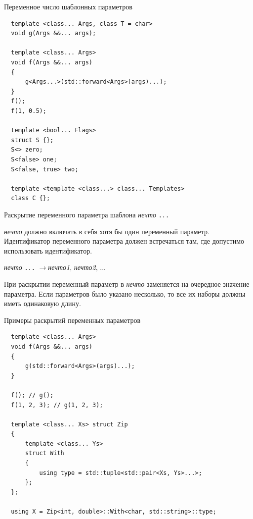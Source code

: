 \documentclass[unknownkeysallowed,xcolor=table]{beamer}
\newcommand{\rarr}{$\rightarrow$}
\begin{document}
\begin{frame}[fragile]{Переменное число шаблонных параметров}
  \begin{lstlisting}
  template <class... Args, class T = char>
  void g(Args &&... args);

  template <class... Args>
  void f(Args &&... args)
  {
      g<Args...>(std::forward<Args>(args)...);
  }
  f();
  f(1, 0.5);

  template <bool... Flags>
  struct S {};
  S<> zero;
  S<false> one;
  S<false, true> two;

  template <template <class...> class... Templates>
  class C {};
  \end{lstlisting}
\end{frame}

\begin{frame}[fragile]{Раскрытие переменного параметра шаблона}
  \emph{нечто} \lstinline{...}

  \vspace{1em}

  \emph{нечто} должно включать в себя хотя бы один переменный параметр.
  Идентификатор переменного параметра должен встречаться там, где допустимо использовать идентификатор.

  \vspace{0.5em}

  \emph{нечто} \lstinline{...} \rarr \emph{нечто1}, \emph{нечто2}, ...

  \vspace{0.5em}

  При раскрытии переменный параметр в \emph{нечто} заменяется на очередное значение параметра.
  Если параметров было указано несколько, то все их наборы должны иметь одинаковую длину.
\end{frame}

\begin{frame}[fragile]{Примеры раскрытий переменных параметров}
  \begin{lstlisting}
  template <class... Args>
  void f(Args &&... args)
  {
      g(std::forward<Args>(args)...);
  }

  f(); // g();
  f(1, 2, 3); // g(1, 2, 3);

  template <class... Xs> struct Zip
  {
      template <class... Ys>
      struct With
      {
          using type = std::tuple<std::pair<Xs, Ys>...>;
      };
  };

  using X = Zip<int, double>::With<char, std::string>::type;
  \end{lstlisting}
\end{frame}
\end{document}
